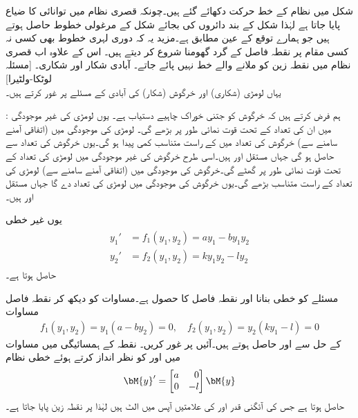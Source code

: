 شکل  میں نظام  کے خط حرکت دکھائے گئے ہیں۔چونکہ قصری نظام میں توانائی کا ضیاع پایا جاتا ہے لہٰذا شکل  کے بند دائروں کی بجائے شکل  کے مرغولی خطوط حاصل ہوتے ہیں جو ہمارے توقع کے عین مطابق ہے۔مزید یہ کہ دوری لہری خطوط بھی کسی نہ کسی مقام پر نقطہ فاصل کے گرد گھومنا شروع کر دیتے ہیں۔ اس کے علاوہ اب قصری نظام میں نقطہ زین کو ملانے والے خط نہیں پائے جاتے۔
\quad آبادی شکار اور شکاری۔ [مسئلہ لوٹکا-ولٹیرا]\\
یہاں لومڑی (شکاری) اور خرگوش (شکار) کی آبادی کے مسئلے پر غور کرتے ہیں۔

: ہم فرض کرتے ہیں کہ خرگوش کو جتنی خوراک چاہیے دستیاب ہے۔ یوں لومڑی کی غیر موجودگی میں ان کی تعداد  کے تحت قوت نمائی طور پر بڑھے گی۔ لومڑی کی موجودگی میں (اتفاقی آمنے سامنے سے)  خرگوش کی تعداد میں  کے راست متناسب کمی پیدا ہو گی۔یوں خرگوش کی تعداد  سے حاصل ہو گی جہاں مستقل  اور  ہیں۔اسی طرح خرگوش کی غیر موجودگی میں لومڑی کی تعداد  کے تحت قوت نمائی طور پر گھٹے گی۔خرگوش کی موجودگی میں (اتفاقی آمنے سامنے سے) لومڑی کی تعداد  کے راست متناسب بڑھے گی۔یوں خرگوش کی موجودگی میں   لومڑی کی تعداد دے گا جہاں مستقل  اور  ہیں۔

یوں غیر خطی  
\begin{gather}\label{مثال_نظام_شکار_شکاری_الف}
\begin{aligned}
y_1'&=f_1(y_1,y_2)=ay_1-by_1y_2\\
y_2'&=f_2(y_1,y_2)=ky_1y_2-ly_2
\end{aligned}
\end{gather}
حاصل ہوتا ہے۔

 مسئلے کو خطی بنانا اور نقطہ فاصل  کا حصول  ہے۔مساوات  کو دیکھ کر نقطہ فاصل مساوات 
\begin{align}
f_1(y_1,y_2)=y_1(a-by_2)=0, \quad f_2(y_1,y_2)=y_2(ky_1-l)=0
\end{align}
کے حل سے  اور  حاصل ہوتے ہیں۔آئیں  پر غور کریں۔ نقطہ  کے ہمسائیگی میں مساوات  میں  اور  کو نظر انداز کرتے ہوئے خطی نظام
\begin{align*}
\bM{y}'=\begin{bmatrix*}[r] a&0\\0&-l \end{bmatrix*}\bM{y}
\end{align*}
حاصل ہوتا ہے جس کی آئگنی قدر  اور  کی علامتیں آپس میں الٹ ہیں لہٰذا  پر نقطہ زین پایا جاتا ہے۔

